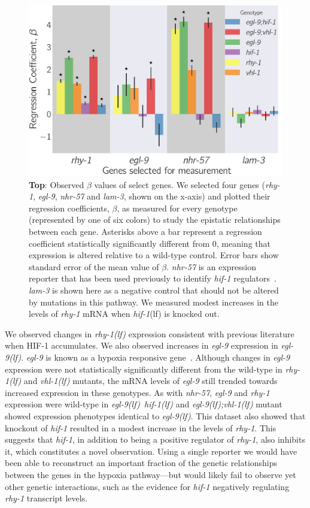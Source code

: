 \documentclass[10pt, onecolumn]{article}
\newcommand{\gene}[1]{\emph{#1}}
\newcommand{\nhr}{\emph{\mbox{nhr-57}}}
\newcommand{\lam}{\emph{\mbox{lam-3}}}
\newcommand{\egl}{\emph{\mbox{egl-9}(lf)}}
\newcommand{\rhy}{\emph{\mbox{rhy-1}(lf)}}
\newcommand{\vhl}{\emph{\mbox{vhl-1}(lf)}}
\newcommand{\eglvhl}{\emph{\mbox{egl-9(lf);vhl-1(lf)}}}
\newcommand{\eglhif}{\emph{\mbox{egl-9(lf)}~\mbox{hif-1(lf)}}}
\newcommand{\hif}{\emph{\mbox{hif-1}}(lf)}
\newcommand{\hifp}{HIF-1}
\begin{document}
\begin{figure}[tbhp]
\centering
\includegraphics[width=.5\linewidth]{../figs/qpcr.pdf}
\caption{
\textbf{Top}: Observed $\beta$ values of select genes. We selected
four genes (\gene{rhy-1}, \gene{egl-9}, \nhr{} and \lam{}, shown on the x-axis)
and plotted their regression coefficients, $\beta$, as measured for every
genotype (represented by one of six colors) to study the epistatic relationships
between each gene. Asterisks above a bar represent a regression coefficient
statistically significantly different from 0, meaning that expression is altered
relative to a wild-type control. Error bars show standard error of the mean
value of $\beta$. \nhr{} is an expression reporter that has been used previously
to identify \gene{hif-1} regulators~\cite{Shen2006,Shao2009}. \lam{} is shown here
as a negative control that should not be altered by mutations in this pathway.
We measured modest increases in the levels of \gene{rhy-1} mRNA when \hif{} is
knocked out.
}
\label{fig:qpcr}
\end{figure}

We observed changes in \rhy{} expression consistent with previous
literature~\cite{Shen2006} when \hifp{} accumulates.
We also observed increases in \gene{egl-9} expression in \egl{}.
\gene{egl-9} is known as a hypoxia responsive gene~\cite{Powell-Coffman2010}.
Although changes in \gene{egl-9} expression were not statistically significantly
different from the wild-type in
\rhy{} and \vhl{} mutants, the mRNA levels of \gene{egl-9} still trended towards
increased expression in these genotypes.
As with \nhr{}, \gene{egl-9} and \gene{rhy-1} expression were wild-type in
\eglhif{} and \eglvhl{} mutant showed expression phenotypes identical to \egl{}.
This dataset also showed that knockout of \gene{hif-1} resulted in a modest
increase in the levels of \gene{rhy-1}. This suggests that \gene{hif-1}, in
addition to being a positive regulator of \gene{rhy-1}, also inhibits it, which
constitutes a novel observation.
Using a single reporter we would have been able to reconstruct an
important fraction of the genetic relationships between the genes in the hypoxia
pathway–--but would likely fail to observe yet other genetic interactions, such as
the evidence for \gene{hif-1} negatively regulating \gene{rhy-1} transcript levels.
\end{document}
